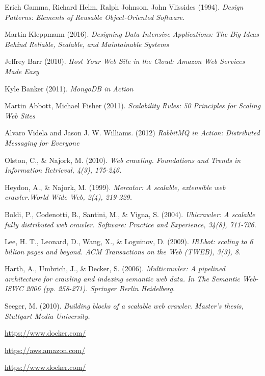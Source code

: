 \renewcommand{\bibname}{References}

\begin{thebibliography}{9}
Erich Gamma, Richard Helm, Ralph Johnson, John Vlissides (1994).
\textit{Design Patterns: Elements of Reusable Object-Oriented Software}.

Martin Kleppmann (2016).
\textit{Designing Data-Intensive Applications: The Big Ideas Behind Reliable, Scalable, and Maintainable Systems}

Jeffrey Barr (2010).
\textit{Host Your Web Site in the Cloud: Amazon Web Services Made Easy}

Kyle Banker (2011).
\textit{MongoDB in Action}

Martin Abbott, Michael Fisher (2011).
\textit{Scalability Rules: 50 Principles for Scaling Web Sites}

Alvaro Videla and Jason J. W. Williams. (2012)
\textit{RabbitMQ in Action: Distributed Messaging for Everyone}

Olston, C., \& Najork, M. (2010).
\textit{Web crawling. Foundations and Trends in Information Retrieval, 4(3), 175-246.}

Heydon, A., \& Najork, M. (1999).
\textit{Mercator: A scalable, extensible web crawler.World Wide Web, 2(4), 219-229.}

Boldi, P., Codenotti, B., Santini, M., \& Vigna, S. (2004).
\textit{Ubicrawler: A scalable fully distributed web crawler. Software: Practice and Experience, 34(8), 711-726.}

Lee, H. T., Leonard, D., Wang, X., \& Loguinov, D. (2009).
\textit{IRLbot: scaling to 6 billion pages and beyond. ACM Transactions on the Web (TWEB), 3(3), 8.}

Harth, A., Umbrich, J., \& Decker, S. (2006).
\textit{Multicrawler: A pipelined architecture for crawling and indexing semantic web data. In The Semantic Web-ISWC 2006 (pp. 258-271). Springer Berlin Heidelberg.}

Seeger, M. (2010).
\textit{Building blocks of a scalable web crawler. Master's thesis, Stuttgart Media University.}

\url{https://www.docker.com/}

\url{https://aws.amazon.com/}

\url{https://www.docker.com/}
\end{thebibliography}